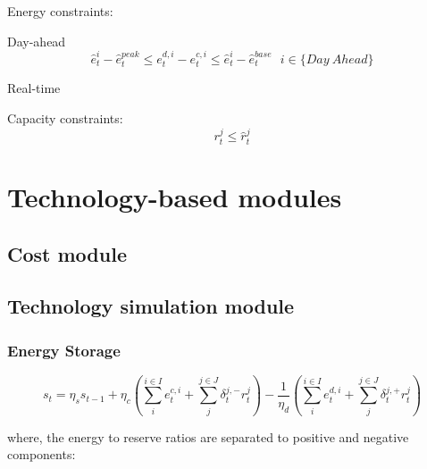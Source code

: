 Energy constraints:

Day-ahead
\begin{equation}
\hat{e}_t^i - \hat{e}_t^{peak} \leq e_t^{d,i} - e_t^{c,i} \leq \hat{e}_t^i - \hat{e}_t^{base} ~~~ i \in \{Day~Ahead\}
\end{equation}

Real-time



Capacity constraints:
\begin{equation}
r_t^j \leq \hat{r}_t^j
\end{equation}


\section{Technology-based modules}

\subsection{Cost module}

\subsection{Technology simulation module}

\subsubsection{Energy Storage}

\begin{equation}
\label{eq:tech-ESS}
s_t = \eta_s s_{t-1} + \eta_c (\sum_{i}^{i \in I} e_t^{c,i} + \sum_{j}^{j \in J}\delta_t^{j,-}r_t^j)- \frac{1}{\eta_d} (\sum_{i}^{i \in I} e_t^{d,i} + \sum_{j}^{j \in J}\delta_t^{j,+}r_t^j)
\end{equation} 

where, the energy to reserve ratios are separated to positive and negative components:

